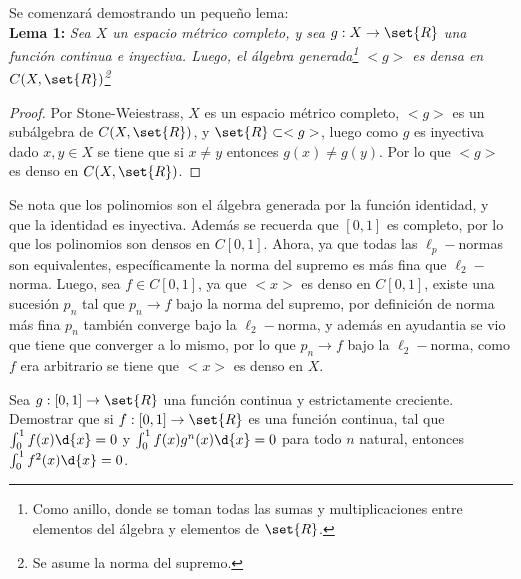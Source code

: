 \begin{sol}
    Se comenzará demostrando un pequeño lema:\\
    \textbf{Lema 1:} \textit{Sea \(X\) un espacio métrico completo, y sea \(g:X\rightarrow\set{R}\) una función continua e inyectiva. Luego, el álgebra generada\footnote{Como anillo, donde se toman todas las sumas y multiplicaciones entre elementos del álgebra y elementos de \(\set{R}\).} \(<g>\) es densa en \(C(X,\set{R})\)\footnote{Se asume la norma del supremo.}}
    \begin{proof}
        Por Stone-Weiestrass, \(X\) es un espacio métrico completo, \(<g>\) es un subálgebra de \(C(X,\set{R})\), y \(\set{R}\subset<g>\), luego como \(g\) es inyectiva dado \(x,y\in X\) se tiene que si \(x\neq y\) entonces \(g(x)\neq g(y)\). Por lo que \(<g>\) es denso en \(C(X,\set{R})\).
    \end{proof}
    \noindent Se nota que los polinomios son el álgebra generada por la función identidad, y que la identidad es inyectiva. Además se recuerda que \([0,1]\) es completo, por lo que los polinomios son densos en \(C[0,1]\). Ahora, ya que todas las \(\ell_p-\)normas son equivalentes, específicamente la norma del supremo es más fina que \(\ell_2-\)norma. Luego, sea \(f\in C[0,1]\), ya que \(<x>\) es denso en \(C[0,1]\), existe una sucesión \(p_n\) tal que \(p_n\rightarrow f\) bajo la norma del supremo, por definición de norma más fina \(p_n\) también converge bajo la \(\ell_2-\)norma, y además en ayudantia se vio que tiene que converger a lo mismo, por lo que \(p_n\rightarrow f\) bajo la \(\ell_2-\)norma, como \(f\) era arbitrario se tiene que \(<x>\) es denso en \(X\).
\end{sol}

\begin{prob}
    Sea \(g:[0,1]\rightarrow\set{R}\) una función continua y estrictamente creciente. Demostrar que si \(f:[0,1]\rightarrow\set{R}\) es una función continua, tal que \(\int_0^1f(x)\d{x}=0\) y \(\int_0^1f(x)g^n(x)\d{x}=0\) para todo \(n\) natural, entonces \(\int_0^1f^2(x)\d{x}=0\).
\end{prob}

